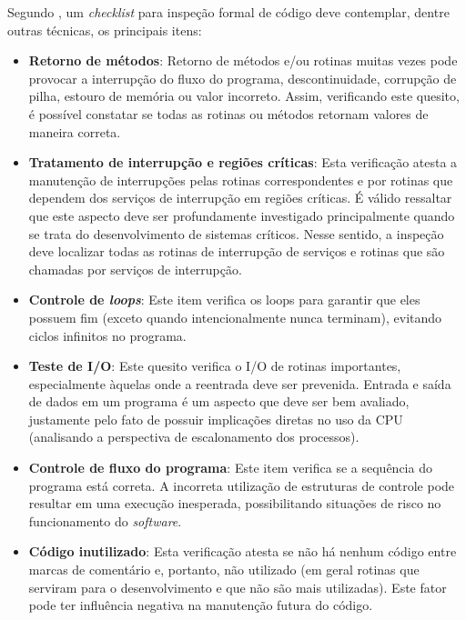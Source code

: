 Segundo \cite{inspecao1}, um \textit{checklist} para inspeção formal de código deve contemplar, dentre outras técnicas, os principais itens:

\begin{itemize}
	\item \textbf{Retorno de métodos}: Retorno de métodos e/ou rotinas muitas vezes pode provocar a interrupção do fluxo do programa, descontinuidade, corrupção de pilha, estouro de memória ou valor incorreto. Assim, verificando este quesito, é possível constatar se todas as rotinas ou métodos retornam valores de maneira correta.

	\item \textbf{Tratamento de interrupção e regiões críticas}: Esta verificação atesta a manutenção de interrupções pelas rotinas correspondentes e por rotinas que dependem dos serviços de interrupção em regiões críticas. É válido ressaltar que este aspecto deve ser profundamente investigado principalmente quando se trata do desenvolvimento de sistemas críticos. Nesse sentido, a inspeção deve localizar todas as rotinas de interrupção de serviços e rotinas que são chamadas por serviços de interrupção.

	\item \textbf{Controle de \textit{loops}}: Este item verifica os loops para garantir que eles possuem fim (exceto quando intencionalmente nunca terminam), evitando ciclos infinitos no programa.

	\item \textbf{Teste de I/O}: Este quesito verifica o I/O de rotinas importantes, especialmente àquelas onde a reentrada deve ser prevenida. Entrada e saída de dados em um programa é um aspecto que deve ser bem avaliado, justamente pelo fato de possuir implicações diretas no uso da CPU (analisando a perspectiva de escalonamento dos processos).

	\item \textbf{Controle de fluxo do programa}: Este item verifica se a sequência do programa está correta. A incorreta utilização de estruturas de controle pode resultar em uma execução inesperada, possibilitando situações de risco no funcionamento do \textit{software}.

	\item \textbf{Código inutilizado}: Esta verificação atesta se não há nenhum código entre marcas de comentário e, portanto, não utilizado (em geral rotinas que serviram para o desenvolvimento e que não são mais utilizadas). Este fator pode ter influência negativa na manutenção futura do código.


\end{itemize}
